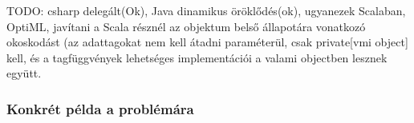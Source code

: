 TODO: csharp delegált(Ok), Java dinamikus öröklődés(ok), ugyanezek Scalaban, OptiML, javítani a Scala résznél az objektum
belső állapotára vonatkozó okoskodást (az adattagokat nem kell átadni paraméterül, csak private[vmi object] kell, és a
tagfüggvények lehetséges implementációi a valami objectben lesznek együtt.


\subsubsection{Konkrét példa a problémára}